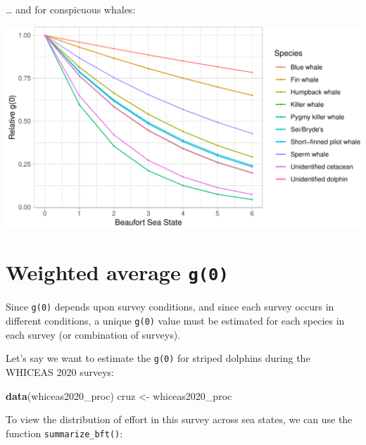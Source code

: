 \documentclass[
]{book}
\newenvironment{Shaded}{\begin{snugshade}}{\end{snugshade}}
\newcommand{\CommentTok}[1]{\textcolor[rgb]{0.56,0.35,0.01}{\textit{#1}}}
\newcommand{\DecValTok}[1]{\textcolor[rgb]{0.00,0.00,0.81}{#1}}
\newcommand{\ErrorTok}[1]{\textcolor[rgb]{0.64,0.00,0.00}{\textbf{#1}}}
\newcommand{\FloatTok}[1]{\textcolor[rgb]{0.00,0.00,0.81}{#1}}
\newcommand{\KeywordTok}[1]{\textcolor[rgb]{0.13,0.29,0.53}{\textbf{#1}}}
\newcommand{\NormalTok}[1]{#1}
\newcommand{\OperatorTok}[1]{\textcolor[rgb]{0.81,0.36,0.00}{\textbf{#1}}}
\newcommand{\StringTok}[1]{\textcolor[rgb]{0.31,0.60,0.02}{#1}}
\begin{document}
\ldots{} and for conspicuous whales:

\includegraphics{figures/unnamed-chunk-125-1.pdf}

\hypertarget{weighted-average-g0}{%
\section*{\texorpdfstring{Weighted average \texttt{g(0)}}{Weighted average g(0)}}\label{weighted-average-g0}}

Since \texttt{g(0)} depends upon survey conditions, and since each survey occurs in different conditions, a unique \texttt{g(0)} value must be estimated for each species in each survey (or combination of surveys).

Let's say we want to estimate the \texttt{g(0)} for striped dolphins during the WHICEAS 2020 surveys:

\begin{Shaded}
\begin{Highlighting}[]
\KeywordTok{data}\NormalTok{(whiceas2020_proc)}
\NormalTok{cruz <-}\StringTok{ }\NormalTok{whiceas2020_proc}
\end{Highlighting}
\end{Shaded}

To view the distribution of effort in this survey across sea states, we can use the function \texttt{summarize\_bft()}:

\begin{Shaded}
\end{Shaded}
\end{document}
